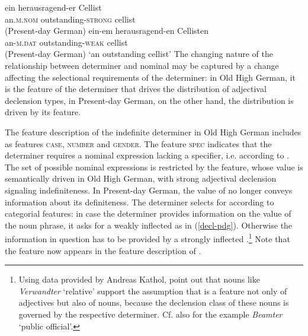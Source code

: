 \documentclass[output=paper
                ,modfonts
                ,nonflat
	        ,collection
	        ,collectionchapter
	        ,collectiontoclongg
 	        ,biblatex
                ,babelshorthands
                ,newtxmath
                ,draftmode
                ,colorlinks, citecolor=brown
]{./langsci/langscibook}
\begin{document}
\eal
\ex 
\gll ein herausragend-er Cellist  \\ an.\textsc{m.nom} outstanding-\textsc{strong} cellist\\  \hfill (Present-day German)
\ex
\gll ein-em herausragend-en Cellisten \\ an-\textsc{m.dat} outstanding-\textsc{weak} {cellist}\\ \hfill (Present-day German)
\glt `an outstanding cellist'
\zl
The changing nature of the relationship between determiner and nominal may be captured by a change affecting the selectional requirements of the determiner: in Old High German, it is the \content feature of the determiner that drives the distribution of adjectival declension types, in Present-day German, on the other hand, the distribution is driven by its \cat feature. 

The feature description of the indefinite determiner in Old High German includes as \AGR {} features \textsc{case}, \textsc{number} and \textsc{gender}. The feature \textsc{spec} indicates that the determiner requires a nominal expression lacking a specifier, i.e. \nom {} according to \cite[64]{SaWaBe2003}. The set of possible nominal expressions is restricted by the \decl feature, whose value is semantically driven in Old High German, with strong adjectival declension signaling indefiniteness.  
\ea 
{}
\z  
In Present-day German, the \decl value of \nom {} no longer conveys information about its definiteness. The determiner selects for \nom according to categorial features: in case the determiner provides information on the \AGR {} value of the noun phrase, it asks for a weakly inflected \nom {} as in (\ref{decl-pdg}). Otherwise the information in question has to be provided by a strongly inflected \nom.\footnote{Using data provided by Andreas Kathol, \cite[373]{PoSa94} point out that nouns like \textit{Verwandter} `relative' support the assumption that \decl {} is a feature not only of adjectives but also of nouns, because the declension class of these nouns is governed by the respective determiner. Cf. also \cite[64]{kiss1995} for the example \textit{Beamter} `public official'.} Note that the \decl feature now appears in the feature description of \cat \citep[65]{kiss1995}.
\ea \label{decl-pdg}
\z 
\end{document}
